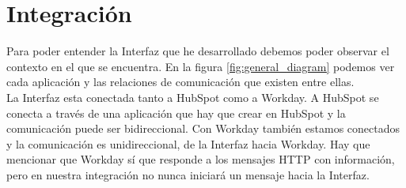 









\chapter{Integración}

Para poder entender la Interfaz que he desarrollado debemos poder observar el contexto en el que se encuentra. En la figura \ref{fig:general_diagram} podemos ver cada aplicación y las relaciones de comunicación que existen entre ellas.\\



La Interfaz esta conectada tanto a HubSpot como a Workday. A HubSpot se conecta a través de una aplicación que hay que crear en HubSpot y la comunicación  puede ser bidireccional.
Con Workday también estamos conectados y la comunicación es unidireccional, de la Interfaz hacia Workday. Hay que mencionar que Workday sí que responde a los mensajes HTTP con información, pero en nuestra integración no  nunca iniciará un mensaje hacia la Interfaz.

